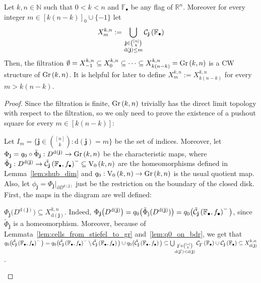 \begin{theorem}\label{thm:gr_is_cw} Let $k,n\in\mathbb{N}$ such that $0<k<n$ and $\mathbb{F}_{\bullet}$ be any flag of $\mathbb{R}^n$. Moreover for every integer $m\in[k(n-k)]_0\cup\{-1\}$ let \[X_m^{k,n}:=\bigcup_{\substack{\mathbf{j}\in\binom{[n]}{k}\\\mathrm{d}(\mathbf{j})\leq m}}\mathcal{C}_{\mathbf{j}}\left(\mathbb{F}_{\bullet}\right)\]
Then, the filtration $\emptyset=X_{-1}^{k,n}\subseteq X_0^{k,n}\subseteq\cdots\subseteq X_{k(n-k)}^{k,n}=\Gr{k}{n}$ is a CW structure of $\Gr{k}{n}$. It is helpful for later to define $X_m^{k,n}:=X_{k(n-k)}^{k,n}$ for every $m>k(n-k)$.
\end{theorem}
\begin{proof}
Since the filtration is finite, $\Gr{k}{n}$ trivially has the direct limit topology with respect to the filtration, so we only need to prove the existence of a pushout square for every $m\in[k(n-k)]$:
\begin{center}
\end{center}
Let $I_m=\big\{\mathbf{j}\in\binom{[n]}{k}:\mathrm{d}(\mathbf{j})=m\big\}$ be the set of indices. Moreover, let $\Phi_{\mathbf{j}}=q_0\circ\tilde{\Phi}_{\mathbf{j}}:D^{\mathrm{d}(\mathbf{j})}\to \Gr{k}{n}$ be the characteristic maps, where $\tilde{\Phi}_{\mathbf{j}}:D^{\mathrm{d}(\mathbf{j})}\to\stcell{j}^-\subseteq\StO{k}{n}$ are the homeomorphisms defined in Lemma~\ref{lem:shub_dim} and $q_0:\StO{k}{n}\to\Gr{k}{n}$ is the usual quotient map. Also, let $\phi_{\mathbf{j}}=\Phi_{\mathbf{j}}|_{\partial D^{\mathrm{d}(\mathbf{j})}}$ just be the restriction on the boundary of the closed disk.
First, the maps in the diagram are well defined:
\begin{i_enum}
\item $\Phi_{\mathbf{j}}\big(D^{\mathrm{d}(\mathbf{j})}\big)\subseteq X_{\mathrm{d}(\mathbf{j})}^{k,n}$. Indeed, $\Phi_{\mathbf{j}}\big(D^{\mathrm{d}(\mathbf{j})}\big)=q_0\big(\tilde{\Phi}_{\mathrm{j}}(D^{\mathrm{d}(\mathbf{j})})\big)=q_0\big(\tilde{\mathcal{C}}_{\mathbf{j}}\left(\mathbb{F}_{\bullet},f_{\bullet}\right)^-\big)$, since $\tilde{\Phi}_{\mathbf{j}}$ is a homeomorphism. Moreover, because of Lemmata~\ref{lem:cells_from_stiefel_to_gr} and~\ref{lem:q0_on_bdr}, we get that $q_0\big(\tilde{\mathcal{C}}_{\mathbf{j}}\left(\mathbb{F}_{\bullet},f_{\bullet}\right)^-\big)=q_0\big(\tilde{\mathcal{C}}_{\mathbf{j}}\left(\mathbb{F}_{\bullet},f_{\bullet}\right)^-\setminus\tilde{\mathcal{C}}_{\mathbf{j}}\left(\mathbb{F}_{\bullet},f_{\bullet}\right)\big)\cup q_0\big(\tilde{\mathcal{C}}_{\mathbf{j}}\left(\mathbb{F}_{\bullet},f_{\bullet}\right)\big)\subseteq\bigcup_{\substack{\mathbf{j}'\in\binom{[n]}{k}\\\mathrm{d}(\mathbf{j}')<\mathrm{d}(\mathbf{j})}}\mathcal{C}_{\mathbf{j'}}\left(\mathbb{F}_{\bullet}\right)\cup\mathcal{C}_{\mathbf{j}}\left(\mathbb{F}_{\bullet}\right)\subseteq X_{\mathrm{d}(\mathbf{j})}^{k,n}$.

\end{i_enum}
\end{proof}
